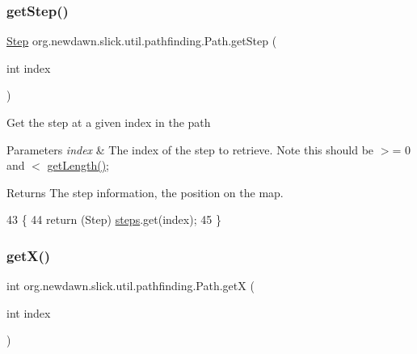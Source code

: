 \subsubsection{\texorpdfstring{get\+Step()}{getStep()}}
{\footnotesize\ttfamily \mbox{\hyperlink{classorg_1_1newdawn_1_1slick_1_1util_1_1pathfinding_1_1_path_1_1_step}{Step}} org.\+newdawn.\+slick.\+util.\+pathfinding.\+Path.\+get\+Step (\begin{DoxyParamCaption}\item[{int}]{index }\end{DoxyParamCaption})\hspace{0.3cm}{\ttfamily [inline]}}

Get the step at a given index in the path


\begin{DoxyParams}{Parameters}
{\em index} & The index of the step to retrieve. Note this should be $>$= 0 and $<$ \mbox{\hyperlink{classorg_1_1newdawn_1_1slick_1_1util_1_1pathfinding_1_1_path_a6aa805d1ba541d0136586273e1e68b2a}{get\+Length()}}; \\
\hline
\end{DoxyParams}
\begin{DoxyReturn}{Returns}
The step information, the position on the map. 
\end{DoxyReturn}

\begin{DoxyCode}
43                                    \{
44         \textcolor{keywordflow}{return} (Step) \mbox{\hyperlink{classorg_1_1newdawn_1_1slick_1_1util_1_1pathfinding_1_1_path_ac2472e1febece895b3e77854043fb4ad}{steps}}.get(index);
45     \}
\end{DoxyCode}
\mbox{\label{classorg_1_1newdawn_1_1slick_1_1util_1_1pathfinding_1_1_path_a87c7bbf87033a3481744cf8a65307ef7}} 
\subsubsection{\texorpdfstring{get\+X()}{getX()}}
{\footnotesize\ttfamily int org.\+newdawn.\+slick.\+util.\+pathfinding.\+Path.\+getX (\begin{DoxyParamCaption}\item[{int}]{index }\end{DoxyParamCaption})\hspace{0.3cm}{\ttfamily [inline]}}

